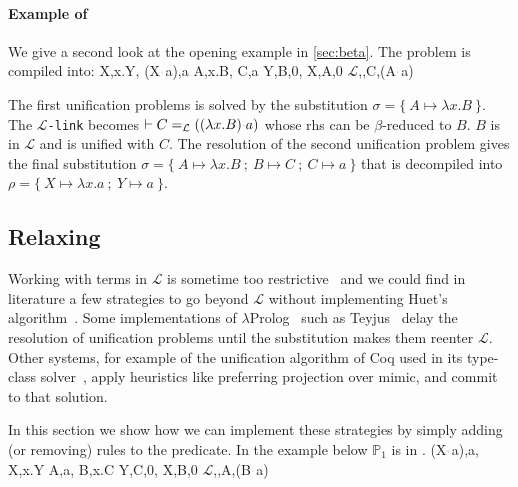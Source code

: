 \documentclass[sigconf,natbib=false,review]{acmart}
\newcommand{\appsep}{\ensuremath{\textcolor{lightgray}{\cdot}}}
\newcommand{\llambda}{\ensuremath{\mathcal{L}}\xspace}
\newcommand{\linkMacro}[1]{\ensuremath{#1}\texttt{-link}\xspace}
\newcommand{\linkbeta}{\linkMacro{\llambda}}
\newcommand{\linkbetaM}[3]{\ensuremath{#1 \vdash #2 =_{\llambda} #3}}
\newcommand{\rhs}{rhs\xspace}
\newcommand{\foUnifPb}{\ensuremath{\mathbb{P}}\xspace}
\begin{document}
\paragraph{Example of \progBetaRH}
We give a second look at the opening example in \cref{sec:beta}.
The problem is compiled into:
%
\printAlll
  {{{X,\lambda x.Y},
    {(X\appsep a),a}}}
  {{{A,\lambda x.B},
    {C,a}}}
  {{{Y,B,0},
    {X,A,0}}}
  {{{\llambda,,C,(A\appsep a)}}}


The first unification problems is solved by the substitution
$\sigma = \{~A \mapsto \lambda x.B~\}$. The \linkbeta becomes
\linkbetaM{}{C}{((\lambda x.B) \appsep a)} whose \rhs can be $\beta$-reduced to
$B$. $B$ is in \llambda and is unified with $C$. The resolution of the second
unification problem
gives the final substitution $\sigma = \{~A \mapsto \lambda x.B ~;~ B \mapsto C ~;~ C
\mapsto a ~\}$ that is decompiled into $\rho = \{~ X \mapsto \lambda x.a ~;~ Y \mapsto
a ~\}$.
 
\subsection{\texorpdfstring{Relaxing }{Relaxing progress-llam-fail}}
\label{sec:heuristics}
\newcommand{\progBetaNoLLWait}{\emph{progress-beta-\notllambda}}

Working with terms in \llambda is sometime too restrictive~\cite{Abel2018ExtensionsTM}
and we could find in literature a few strategies to go beyond \llambda without 
implementing Huet's algorithm~\cite{Huet75}.
Some implementations of $\lambda$Prolog~\cite{lamProlog} such as
Teyjus~\cite{Nadathur2001} delay the resolution of \notllambda unification
problems until the substitution makes them reenter \llambda. Other systems, for
example of the unification algorithm of Coq used in its type-class
solver~\cite{sozeau08}, apply heuristics like preferring projection over mimic,
and commit to that solution.

In this section we show how we can implement these strategies
by simply adding (or removing) rules to the
 predicate.
In the example below $\foUnifPb_1$ is in \notllambda.
%
\printAlll
  {{{(X\appsep a),a},
    {X,\lambda x.Y}}}
  {{{A,a},
    {B,\lambda x.C}}}
  {{{Y,C,0},
    {X,B,0}}}
  {{{\llambda,,A,(B\appsep a)}}}
\end{document}
